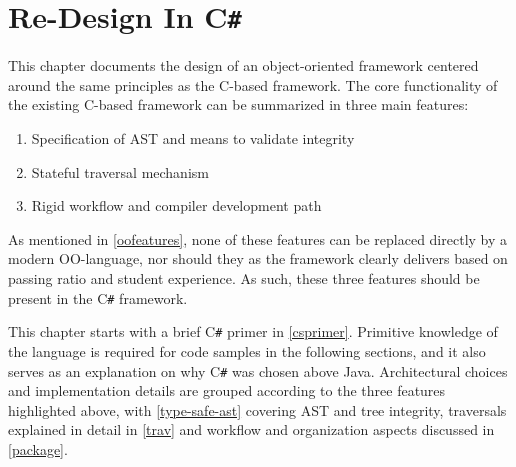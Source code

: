 \documentclass[twoside,openright]{uva-bachelor-thesis}
\newcommand{\cs}{C\texttt{\#}\xspace}
\begin{document}

	
	
\chapter{Re-Design In \cs}
	This chapter documents the design of an object-oriented framework centered around the same principles as the C-based framework. The core functionality of the existing C-based framework can be summarized in three main features:
	\begin{enumerate}
		\item Specification of AST and means to validate integrity
		\item Stateful traversal mechanism
		\item Rigid workflow and compiler development path
	\end{enumerate}
	
	As mentioned in \cref{oofeatures}, none of these features can be replaced directly by a modern OO-language, nor should they as the framework clearly delivers based on passing ratio and student experience. As such, these three features should be present in the \cs framework.
	
	This chapter starts with a brief \cs primer in \cref{csprimer}. Primitive knowledge of the language is required for code samples in the following sections, and it also serves as an explanation on why \cs was chosen above Java. Architectural choices and implementation details are grouped according to the three features highlighted above, with \cref{type-safe-ast} covering AST and tree integrity, traversals explained in detail in \cref{trav} and workflow and organization aspects discussed in \cref{package}.
			
\end{document}
